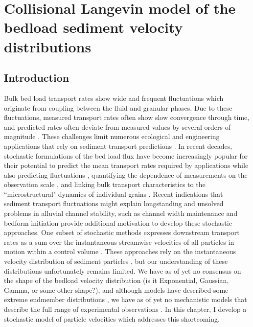 
\chapter{Collisional Langevin model of the bedload sediment velocity distributions}
\label{ch:langevin}
\section{Introduction}

Bulk bed load transport rates show wide and frequent fluctuations which originate from coupling between the fluid and granular phases.
Due to these fluctuations, measured transport rates often show slow convergence through time, and predicted rates often deviate from measured values by several orders of magnitude \citep{Ancey2020}.
These challenges limit numerous ecological and engineering applications that rely on sediment transport predictions \citep{}.
In recent decades, stochastic formulations of the bed load flux have become increasingly popular for their potential to predict the mean transport rates required by applications while also predicting fluctuations \citep{Ancey2008}, quantifying the dependence of measurements on the observation scale \citep{Turowski2010}, and linking bulk transport characteristics to the ``microstructural" dynamics of individual grains \citep{Ancey2014}.
Recent indications that sediment transport fluctuations might explain longstanding and unsolved problems in alluvial channel stability, such as channel width maintenance \citep{Abramian2019} and bedform initiation \citep{Jerolmack2005,Bohorquez2016} provide additional motivation to develop these stochastic approaches.
One subset of stochastic methods expresses downstream transport rates as a sum over the instantaneous streamwise velocities of all particles in motion within a control volume \citep{Ancey2008,Furbish2012}.
These approaches rely on the instantaneous velocity distribution of sediment particles \citep{Lajeunesse2010}, but our understanding of these distributions unfortunately remains limited.
We have as of yet no consensus on the shape of the bedload velocity distribution (is it Exponential, Gaussian, Gamma, or some other shape?), and although models have described some extreme endmember distributions \citep[e.g.][]{Fan2014,Ancey2014}, we have as of yet no mechanistic models that describe the full range of experimental observations \citep{Lajeunesse2010,Fathel2015,Heyman2016,Liu2019,Houssais2012}.
In this chapter, I develop a stochastic model of particle velocities which addresses this shortcoming.

